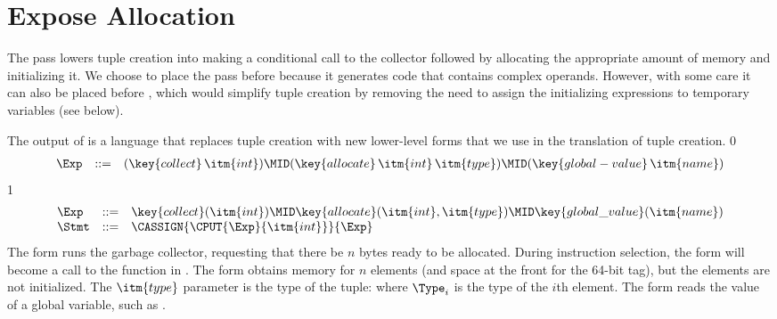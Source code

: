 \documentclass[7x10]{TimesAPriori_MIT}%
\def\racketEd{0}
\def\pythonEd{1}
\def\edition{1}
\newcommand{\racket}[1]{{\if\edition\racketEd{#1}\fi}}
\newcommand{\pythonColor}[0]{}
\newcommand{\python}[1]{{\if\edition\pythonEd\pythonColor #1\fi}}
\numberwithin{theorem}{chapter}
\numberwithin{definition}{chapter}
\numberwithin{equation}{chapter}
\begin{document}



\section{Expose Allocation}
\label{sec:expose-allocation}

The pass  lowers tuple creation into making a
conditional call to the collector followed by allocating the
appropriate amount of memory and initializing it.  We choose to place
the  pass before
 because it generates code that
contains complex operands. However, with some care it can also be
placed before , which would simplify
tuple creation by removing the need to assign the initializing
expressions to temporary variables (see below).

The output of  is a language \LangAlloc{}
that replaces tuple creation with new lower-level forms that we use in the
translation of tuple creation.
%
{\if\edition\racketEd
\[
\begin{array}{lcl}
  \Exp &::=& (\key{collect} \,\itm{int})
      \MID (\key{allocate} \,\itm{int}\,\itm{type})
      \MID (\key{global-value} \,\itm{name}) 
\end{array}
\]
\fi}
{\if\edition\pythonEd\pythonColor
\[
\begin{array}{lcl}
  \Exp &::=& \key{collect}(\itm{int})
      \MID \key{allocate}(\itm{int},\itm{type})
      \MID \key{global\_value}(\itm{name}) \\
   \Stmt &::= & \CASSIGN{\CPUT{\Exp}{\itm{int}}}{\Exp}
\end{array}
\]
\fi}
%
The  form runs the garbage collector, requesting that
there be $n$ bytes ready to be allocated. During instruction
selection, the 
form will become a call to the  function in
.
%
The  form obtains memory for $n$ elements (and
space at the front for the 64-bit tag), but the elements are not
initialized.   The $\itm{type}$ parameter is the type
of the tuple:
%
\VECTY{\racket{$\Type_1 \ldots \Type_n$}\python{$\Type_1, \ldots, \Type_n$}}
%
where $\Type_i$ is the type of the $i$th element.
%
The  form reads the value of a global
variable, such as .
\end{document}
